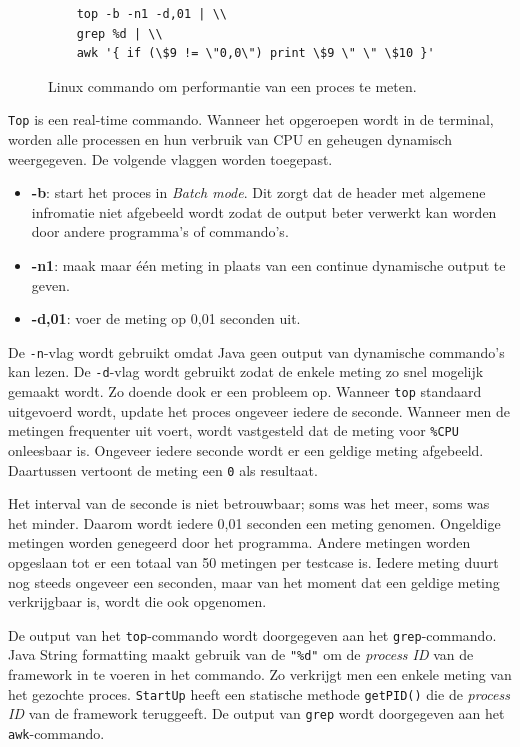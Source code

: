 \begin{figure}
\centering
\begin{verbatim}
	top -b -n1 -d,01 | \\
	grep %d | \\
	awk '{ if (\$9 != \"0,0\") print \$9 \" \" \$10 }'
\end{verbatim}
\caption{Linux commando om performantie van een proces te meten.}
\label{command}
\end{figure}

\verb+Top+ is een real-time commando. Wanneer het opgeroepen wordt in de terminal, worden alle processen en hun verbruik van CPU en geheugen dynamisch weergegeven. \autocite{topcommand} De volgende vlaggen worden toegepast.

\begin{itemize}
	\item \textbf{-b}: start het proces in \textit{Batch mode}. Dit zorgt dat de header met algemene infromatie niet afgebeeld wordt zodat de output beter verwerkt kan worden door andere programma's of commando's.
	\item \textbf{-n1}: maak maar één meting in plaats van een continue dynamische output te geven.
	\item \textbf{-d,01}: voer de meting op 0,01 seconden uit.
\end{itemize}

De \verb+-n+-vlag wordt gebruikt omdat Java geen output van dynamische commando's kan lezen. De \verb+-d+-vlag wordt gebruikt zodat de enkele meting zo snel mogelijk gemaakt wordt. Zo doende dook er een probleem op. Wanneer \verb+top+ standaard uitgevoerd wordt, update het proces ongeveer iedere de seconde. Wanneer men de metingen frequenter uit voert, wordt vastgesteld dat de meting voor \verb+%CPU+ onleesbaar is. Ongeveer iedere seconde wordt er een geldige meting afgebeeld. Daartussen vertoont de meting een \verb+0+ als resultaat.

Het interval van de seconde is niet betrouwbaar; soms was het meer, soms was het minder. Daarom wordt iedere 0,01 seconden een meting genomen. Ongeldige metingen worden genegeerd door het programma. Andere metingen worden opgeslaan tot er een totaal van 50 metingen per testcase is. Iedere meting duurt nog steeds ongeveer een seconden, maar van het moment dat een geldige meting verkrijgbaar is, wordt die ook opgenomen. 

De output van het \verb+top+-commando wordt doorgegeven aan het \verb+grep+-commando. Java String formatting maakt gebruik van de \verb|"%d"| om de \textit{process ID} van de framework in te voeren in het commando. Zo verkrijgt men een enkele meting van het gezochte proces. \verb+StartUp+ heeft een statische methode \verb+getPID()+ die de \textit{process ID} van de framework teruggeeft. De output van \verb+grep+ wordt doorgegeven aan het \verb+awk+-commando.

